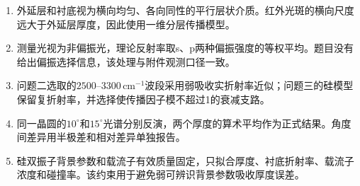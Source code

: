 \begin{enumerate}[label=\textbf{假设\arabic*:},leftmargin=4.5em]
\item 外延层和衬底视为横向均匀、各向同性的平行层状介质。红外光斑的横向尺度远大于外延层厚度，因此使用一维分层传播模型。
\item 测量光视为非偏振光，理论反射率取s、p两种偏振强度的等权平均。题目没有给出偏振选择信息，该处理与附件观测口径一致。
\item 问题二选取的$2500$--$3300\,\mathrm{cm}^{-1}$波段采用弱吸收实折射率近似；问题三的硅模型保留复折射率，并选择使传播因子模不超过1的衰减支路。
\item 同一晶圆的$10^\circ$和$15^\circ$光谱分别反演，两个厚度的算术平均作为正式结果。角度间差异用半极差和相对差异单独报告。
\item 硅双振子背景参数和载流子有效质量固定，只拟合厚度、衬底折射率、载流子浓度和碰撞率。该约束用于避免弱可辨识背景参数吸收厚度误差。
\end{enumerate}
